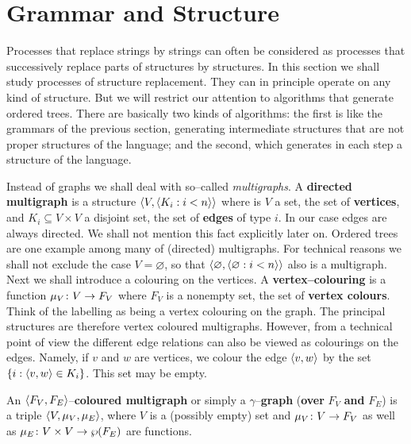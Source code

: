 \section{Grammar and Structure}
\label{einsvier}
%
%
%
Processes that replace strings by strings can often be considered 
as processes that successively replace parts of structures by 
structures. In this section we shall study processes of structure 
replacement. They can in principle operate on any kind of structure.
But we will restrict our attention to algorithms that generate ordered 
trees. There are basically two kinds of algorithms: the first is 
like the grammars of the previous section, generating intermediate 
structures that are not proper structures of the language; and the 
second, which generates in each step a structure of the language.

Instead of graphs we shall deal with so--called {\it multigraphs}. 
A \textbf{directed multigraph} is
a structure $\langle V, \langle K_i : i < n\rangle\rangle$ where is $V$
a set, the set of \textbf{vertices}, and $K_i \subseteq V \times V$
a disjoint set, the set of \textbf{edges} of type $i$. In our case
edges are always directed. We shall not mention this fact explicitly
later on. Ordered trees are one example
among many of (directed) multigraphs. For technical reasons we shall 
not exclude the case $V = \varnothing$, so that $\langle \varnothing, 
\langle \varnothing : i < n\rangle\rangle$ also is a multigraph. Next we shall 
introduce a
colouring on the vertices. A \textbf{vertex--colouring} is a
function $\mu_V \colon V \rightarrow F_V$ where $F_V$ is a nonempty set, the
set of \textbf{vertex colours}.
Think of the labelling as being a vertex colouring on the graph.
The principal structures are therefore vertex coloured multigraphs.
However, from a technical point of view the different edge relations
can also be viewed as colourings on the edges. Namely, if
$v$ and $w$ are vertices, we colour the edge $\langle v,w\rangle$ by
the set $\{i : \langle v,w\rangle \in K_i\}$. This set may be empty.
\begin{defn}
An $\langle F_V, F_E\rangle$--\textbf{coloured multigraph}
or simply a $\gamma$--\textbf{graph} (\textbf{over}
$F_V$ \textbf{and} $F_E$) is a triple $\langle V, \mu_V, \mu_E\rangle$,
where $V$ is a (possibly empty) set and $\mu_V \colon V \rightarrow F_V$ as
well as $\mu_E \colon V \times V \rightarrow \wp(F_E)$ are functions.
\end{defn}
